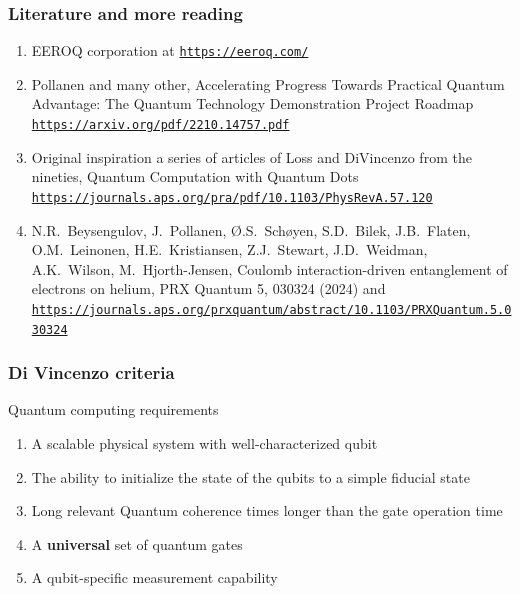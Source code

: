 \documentclass{beamer}
\begin{document}
\begin{frame}
\frametitle{Literature and more reading}

\begin{block}{}
\begin{enumerate}
\item EEROQ corporation at \href{{https://eeroq.com/}}{\nolinkurl{https://eeroq.com/}}

\item Pollanen and many other, Accelerating Progress Towards Practical Quantum Advantage: The Quantum Technology Demonstration Project Roadmap \href{{https://arxiv.org/pdf/2210.14757.pdf}}{\nolinkurl{https://arxiv.org/pdf/2210.14757.pdf}}

\item Original inspiration a series of articles of Loss and DiVincenzo from the nineties, Quantum Computation with Quantum Dots \href{{https://journals.aps.org/pra/pdf/10.1103/PhysRevA.57.120}}{\nolinkurl{https://journals.aps.org/pra/pdf/10.1103/PhysRevA.57.120}}

\item N.R.~Beysengulov, J.~Pollanen, \O .S.~Sch\o yen, S.D.~Bilek, J.B.~Flaten, O.M.~Leinonen, H.E.~Kristiansen, Z.J.~Stewart, J.D.~Weidman, A.K.~Wilson, M.~Hjorth-Jensen, Coulomb interaction-driven entanglement of electrons on helium, PRX Quantum 5, 030324 (2024) and \href{{https://journals.aps.org/prxquantum/abstract/10.1103/PRXQuantum.5.030324}}{\nolinkurl{https://journals.aps.org/prxquantum/abstract/10.1103/PRXQuantum.5.030324}}
\end{enumerate}

\noindent
\end{block}
\end{frame}

\begin{frame}
\frametitle{Di Vincenzo criteria}

\begin{alertblock}{Quantum computing requirements }
\begin{enumerate}
\item A scalable physical system with well-characterized qubit

\item The ability to initialize the state of the qubits to a simple fiducial state

\item Long relevant Quantum coherence times longer than the gate operation time

\item A \textbf{universal} set of quantum gates

\item A qubit-specific measurement capability
\end{enumerate}

\noindent
\end{alertblock}
\end{frame}
\end{document}

